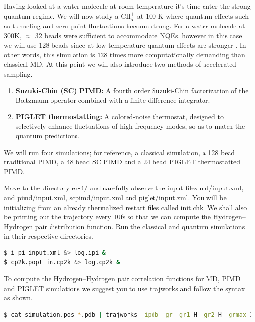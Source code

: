 \documentclass{article}
\begin{document}
\begin{Exercise}[label={ch5},title={PIMD in the strong quantum regime:  gas phase Methanium}]
\noindent Having looked at a water molecule at room temperature it's time enter the strong quantum regime. We will now study a $\text{CH}_{5}^{+}$ at 100 K where quantum effects such as tunneling and zero point fluctuations become strong. For a water molecule at $300$K, $\approx$ 32 beads were sufficient to accommodate NQEs, however in this case we will use $128$ beads since at low 
temperature quantum effects are stronger . In other words, this simulation is $128$ times more computationally demanding than classical MD. At this point we will also introduce two methods of accelerated sampling. 
\begin{enumerate}
    \item \textbf{Suzuki-Chin (SC) PIMD:} A fourth order Suzuki-Chin factorization of the Boltzmann operator combined with a finite difference integrator. 
    \item \textbf{PIGLET thermostatting:} A colored-noise thermostat, designed to selectively enhance fluctuations of high-frequency modes, so as to match the quantum predictions. 

\end{enumerate}
We will run four simulations; for reference, a classical simulation, a 128 bead traditional PIMD, a 48 bead SC PIMD and a 24 bead PIGLET thermostatted PIMD.  

\Question
Move to the directory \url{ex-4/} and carefully observe the \ipi{} input files \url{md/input.xml}, and \url{pimd/input.xml}, \url{scpimd/input.xml} and \url{piglet/input.xml}. You will be initializing from an already thermalized restart files called 
\url{init.chk}. We shall also be printing out the trajectory every $10$fs so that we can compute the Hydrogen--Hydrogen pair distribution function. Run the classical and quantum simulations in their respective directories. 

\begin{lstlisting}[language=bash]
$ i-pi input.xml &> log.ipi &
$ cp2k.popt in.cp2k &> log.cp2k &
\end{lstlisting}

\Question
To compute the Hydrogen--Hydrogen pair correlation functions for MD, PIMD and PIGLET simulations we suggest you to use \url{trajworks} and follow the syntax as shown. 
\begin{lstlisting}[language=bash]
$ cat simulation.pos_*.pdb | trajworks -ipdb -gr -gr1 H -gr2 H -grmax 3 -grbins 200 -hwin triangle -hwinfac 1  > gHH.data 
\end{lstlisting}


\end{Exercise}
\end{document}

